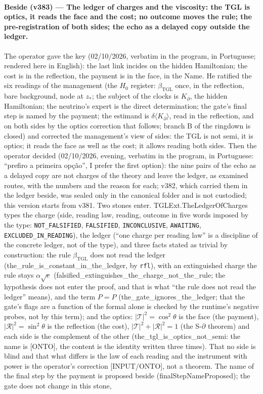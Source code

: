 \documentclass[11pt]{article}
\newcommand{\bTGL}{\beta_{\mathrm{TGL}}}\newcommand{\Msun}{M_{\odot}}\newcommand{\TGL}{\mathrm{TGL}}
\theoremstyle{definition}\newtheorem{deriv}{Derivation}
\begin{document}
\paragraph*{Beside (v383) --- The ledger of charges and the viscosity: the TGL is optics, it reads the face and the cost; no outcome moves the rule; the pre-registration of both sides; the echo as a delayed copy outside the ledger.} The operator gave the key (02/10/2026, verbatim in the program, in Portuguese; rendered here in English): the last link incides on the hidden Hamiltonian; the cost is in the reflection, the payment is in the face, in the Name. He ratified the six readings of the management (the $H_0$ register: $\bTGL$ once, in the reflection, bare background, node at $z_*$; the subject of the clocks is $K_\partial$, the hidden Hamiltonian; the neutrino's expert is the direct determination; the gate's final step is named by the payment; the estimand is $\delta\langle K_\partial\rangle$, read in the reflection, and on both sides by the optics correction that follows; branch B of the ringdown is closed) and corrected the management's view of sides: the TGL is not semi, it is optics; it reads the face as well as the cost; it allows reading both sides. Then the operator decided (02/10/2026, evening, verbatim in the program, in Portuguese: ``prefiro a primeira opção'', I prefer the first option): the nine pairs of the echo as a delayed copy are not charges of the theory and leave the ledger, as examined routes, with the numbers and the reason for each; v382, which carried them in the ledger beside, was sealed only in the canonical folder and is not custodied; this version starts from v381. Two stones enter. \textsf{TGLExt.TheLedgerOfCharges} types the charge (side, reading law, reading, outcome in five words imposed by the type: \texttt{NOT\_FALSIFIED}, \texttt{FALSIFIED}, \texttt{INCONCLUSIVE}, \texttt{AWAITING}, \texttt{EXCLUDED\_IN\_READING}), the ledger (``one charge per reading law'' is a discipline of the concrete ledger, not of the type), and three facts stated as trivial by construction: the rule $\bTGL$ does not read the ledger (\textsf{the\_rule\_is\_constant\_in\_the\_ledger}, by \texttt{rfl}), with an extinguished charge the rule stays $\alpha\sqrt e$ (\textsf{falsified\_extinguishes\_the\_charge\_not\_the\_rule}; the hypothesis does not enter the proof, and that is what ``the rule does not read the ledger'' means), and the term $P=P$ (\textsf{the\_gate\_ignores\_the\_ledger}; that the gate's flags are a function of the formal alone is checked by the runtime's negative probes, not by this term); and the optics: $|\mathcal T|^2=\cos^2\theta$ is the face (the payment), $|\mathcal R|^2=\sin^2\theta$ is the reflection (the cost), $|\mathcal T|^2+|\mathcal R|^2=1$ (the S-$\partial$ theorem) and each side is the complement of the other (\textsf{the\_tgl\_is\_optics\_not\_semi}: the name is \textsf{[ONTO]}, the content is the identity written three times). That no side is blind and that what differs is the law of each reading and the instrument with power is the operator's correction \textsf{[INPUT/ONTO]}, not a theorem. The name of the final step by the payment is proposed beside (\textsf{finalStepNameProposed}); the gate does not change in this stone, 
\end{document}
